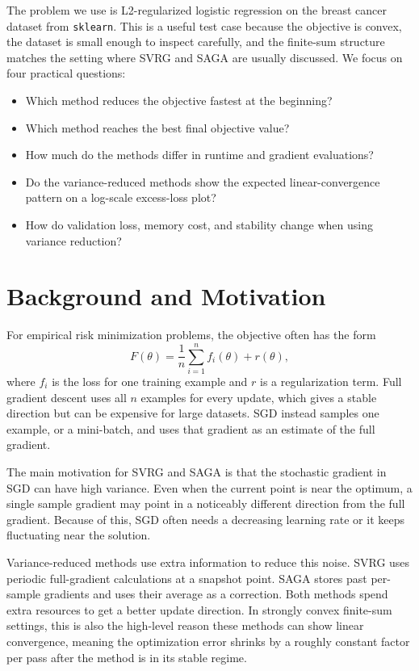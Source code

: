 \documentclass{article}
\begin{document}
The problem we use is L2-regularized logistic regression on the breast cancer
dataset from \texttt{sklearn}. This is a useful test case because the objective
is convex, the dataset is small enough to inspect carefully, and the finite-sum
structure matches the setting where SVRG and SAGA are usually discussed. We
focus on four practical questions:
\begin{itemize}
    \item Which method reduces the objective fastest at the beginning?
    \item Which method reaches the best final objective value?
    \item How much do the methods differ in runtime and gradient evaluations?
    \item Do the variance-reduced methods show the expected linear-convergence
    pattern on a log-scale excess-loss plot?
    \item How do validation loss, memory cost, and stability change when using
    variance reduction?
\end{itemize}

\section{Background and Motivation}

For empirical risk minimization problems, the objective often has the form
\[
F(\theta) = \frac{1}{n}\sum_{i=1}^{n} f_i(\theta) + r(\theta),
\]
where $f_i$ is the loss for one training example and $r$ is a regularization
term. Full gradient descent uses all $n$ examples for every update, which gives
a stable direction but can be expensive for large datasets. SGD instead samples
one example, or a mini-batch, and uses that gradient as an estimate of the full
gradient.

The main motivation for SVRG and SAGA is that the stochastic gradient in SGD can
have high variance. Even when the current point is near the optimum, a single
sample gradient may point in a noticeably different direction from the full
gradient. Because of this, SGD often needs a decreasing learning rate or it
keeps fluctuating near the solution.

Variance-reduced methods use extra information to reduce this noise. SVRG uses
periodic full-gradient calculations at a snapshot point. SAGA stores past
per-sample gradients and uses their average as a correction. Both methods spend
extra resources to get a better update direction. In strongly convex finite-sum
settings, this is also the high-level reason these methods can show linear
convergence, meaning the optimization error shrinks by a roughly constant factor
per pass after the method is in its stable regime.
\end{document}
